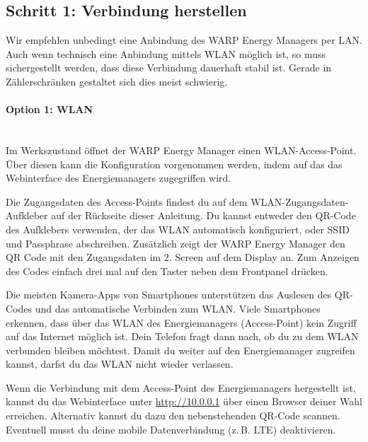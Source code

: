 \documentclass[a4paper,10pt]{article}
\newcommand{\hint}[1]{\begin{tcolorbox}[colback=boxgray,colframe=black,coltext=
white,title=Hinweis,left*=2mm,right*=2mm,boxsep=1mm,bottom=1mm,top=1mm]#1\end{tcolorbox}}
\begin{document}
\begin{multicols*}{2}
	\subsection{Schritt 1: Verbindung herstellen}


	\hint{Wir empfehlen unbedingt eine Anbindung des WARP Energy Managers per
	LAN. Auch wenn technisch eine Anbindung mittels WLAN möglich ist, so muss
	sichergestellt werden, dass diese Verbindung dauerhaft stabil ist. Gerade in
	Zählerschränken gestaltet sich dies meist schwierig.}

	\paragraph{Option 1: WLAN}\ \\
	Im Werkszustand öffnet der WARP Energy Manager einen WLAN-Access-Point. Über diesen kann
	die Konfiguration vorgenommen werden, indem auf das das Webinterface des
	Energiemanagers zugegriffen wird.

	Die Zugangsdaten des Access-Points findest du auf dem WLAN-Zugangsdaten-Aufkleber
	auf der Rückseite dieser Anleitung. Du kannst entweder den QR-Code des Aufklebers verwenden,
	der das WLAN automatisch konfiguriert, oder SSID und Passphrase abschreiben.
    Zusätzlich zeigt der WARP Energy Manager den QR Code mit den Zugangsdaten im 2. Screen auf dem
    Display an. Zum Anzeigen des Codes einfach drei mal auf den Taster neben dem Frontpanel drücken.
    
	Die meisten Kamera-Apps von Smartphones unterstützen das Auslesen des
	QR-Codes und das automatische Verbinden zum WLAN. Viele Smartphones
	erkennen, dass über das WLAN des Energiemanagers (Access-Point) kein Zugriff auf das
	Internet möglich ist. Dein Telefon fragt dann nach, ob du zu dem WLAN
	verbunden bleiben möchtest. Damit du weiter auf den Energiemanager zugreifen
	kannst, darfst du das WLAN nicht wieder verlassen.

	\begin{minipage}{0.35\textwidth}
		Wenn die Verbindung mit dem Access-Point des Energiemanagers hergestellt ist, kannst du das Webinterface
		unter \url{http://10.0.0.1} über einen Browser deiner Wahl erreichen.
		Alternativ kannst du dazu den nebenstehenden QR-Code scannen.
		Eventuell musst du deine mobile Datenverbindung (z.\,B. LTE) deaktivieren.
	\end{minipage}\hfill
	\begin{minipage}{0.12\textwidth}
		\begin{flushright}
		\end{flushright}
	\end{minipage}


\end{multicols*}
\end{document}
